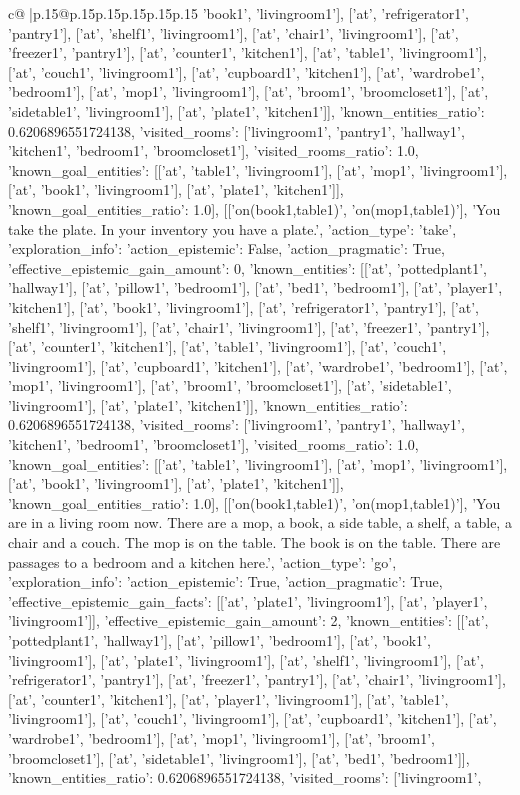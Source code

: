 \documentclass{article}
\begin{document}
{\begin{supertabular}{c@{$\;$}|p{.15\linewidth}@{}p{.15\linewidth}p{.15\linewidth}p{.15\linewidth}p{.15\linewidth}p{.15\linewidth}}
{{{'book1', 'livingroom1'], ['at', 'refrigerator1', 'pantry1'], ['at', 'shelf1', 'livingroom1'], ['at', 'chair1', 'livingroom1'], ['at', 'freezer1', 'pantry1'], ['at', 'counter1', 'kitchen1'], ['at', 'table1', 'livingroom1'], ['at', 'couch1', 'livingroom1'], ['at', 'cupboard1', 'kitchen1'], ['at', 'wardrobe1', 'bedroom1'], ['at', 'mop1', 'livingroom1'], ['at', 'broom1', 'broomcloset1'], ['at', 'sidetable1', 'livingroom1'], ['at', 'plate1', 'kitchen1']], 'known_entities_ratio': 0.6206896551724138, 'visited_rooms': ['livingroom1', 'pantry1', 'hallway1', 'kitchen1', 'bedroom1', 'broomcloset1'], 'visited_rooms_ratio': 1.0, 'known_goal_entities': [['at', 'table1', 'livingroom1'], ['at', 'mop1', 'livingroom1'], ['at', 'book1', 'livingroom1'], ['at', 'plate1', 'kitchen1']], 'known_goal_entities_ratio': 1.0}}], [['on(book1,table1)', 'on(mop1,table1)'], 'You take the plate. In your inventory you have a plate.', {'action_type': 'take', 'exploration_info': {'action_epistemic': False, 'action_pragmatic': True, 'effective_epistemic_gain_amount': 0, 'known_entities': [['at', 'pottedplant1', 'hallway1'], ['at', 'pillow1', 'bedroom1'], ['at', 'bed1', 'bedroom1'], ['at', 'player1', 'kitchen1'], ['at', 'book1', 'livingroom1'], ['at', 'refrigerator1', 'pantry1'], ['at', 'shelf1', 'livingroom1'], ['at', 'chair1', 'livingroom1'], ['at', 'freezer1', 'pantry1'], ['at', 'counter1', 'kitchen1'], ['at', 'table1', 'livingroom1'], ['at', 'couch1', 'livingroom1'], ['at', 'cupboard1', 'kitchen1'], ['at', 'wardrobe1', 'bedroom1'], ['at', 'mop1', 'livingroom1'], ['at', 'broom1', 'broomcloset1'], ['at', 'sidetable1', 'livingroom1'], ['at', 'plate1', 'kitchen1']], 'known_entities_ratio': 0.6206896551724138, 'visited_rooms': ['livingroom1', 'pantry1', 'hallway1', 'kitchen1', 'bedroom1', 'broomcloset1'], 'visited_rooms_ratio': 1.0, 'known_goal_entities': [['at', 'table1', 'livingroom1'], ['at', 'mop1', 'livingroom1'], ['at', 'book1', 'livingroom1'], ['at', 'plate1', 'kitchen1']], 'known_goal_entities_ratio': 1.0}}], [['on(book1,table1)', 'on(mop1,table1)'], 'You are in a living room now. There are a mop, a book, a side table, a shelf, a table, a chair and a couch. The mop is on the table. The book is on the table. There are passages to a bedroom and a kitchen here.', {'action_type': 'go', 'exploration_info': {'action_epistemic': True, 'action_pragmatic': True, 'effective_epistemic_gain_facts': [['at', 'plate1', 'livingroom1'], ['at', 'player1', 'livingroom1']], 'effective_epistemic_gain_amount': 2, 'known_entities': [['at', 'pottedplant1', 'hallway1'], ['at', 'pillow1', 'bedroom1'], ['at', 'book1', 'livingroom1'], ['at', 'plate1', 'livingroom1'], ['at', 'shelf1', 'livingroom1'], ['at', 'refrigerator1', 'pantry1'], ['at', 'freezer1', 'pantry1'], ['at', 'chair1', 'livingroom1'], ['at', 'counter1', 'kitchen1'], ['at', 'player1', 'livingroom1'], ['at', 'table1', 'livingroom1'], ['at', 'couch1', 'livingroom1'], ['at', 'cupboard1', 'kitchen1'], ['at', 'wardrobe1', 'bedroom1'], ['at', 'mop1', 'livingroom1'], ['at', 'broom1', 'broomcloset1'], ['at', 'sidetable1', 'livingroom1'], ['at', 'bed1', 'bedroom1']], 'known_entities_ratio': 0.6206896551724138, 'visited_rooms': ['livingroom1', }}}
\end{supertabular}}
\end{document}
